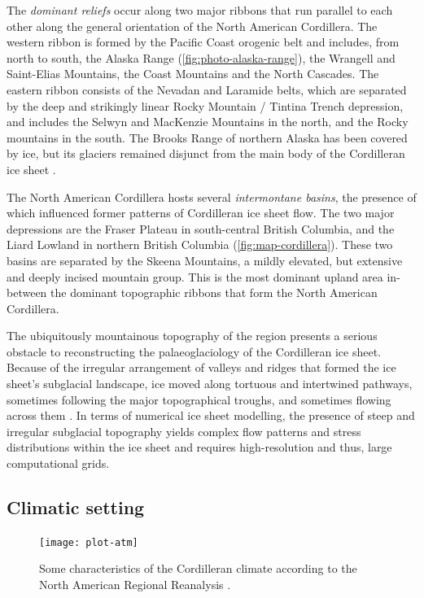 \documentclass[a4paper]{kappa}
\begin{document}
The \emph{dominant reliefs} occur along two major ribbons that run parallel to
each other along the general orientation of the North American Cordillera. The
western ribbon is formed by the Pacific Coast orogenic belt and includes, from
north to south, the Alaska Range (\cref{fig:photo-alaska-range}), the Wrangell
and Saint-Elias Mountains,
the Coast Mountains and the North Cascades. The eastern ribbon consists of the
Nevadan and Laramide belts, which are separated by the deep and strikingly
linear Rocky Mountain / Tintina Trench depression, and includes the Selwyn and
MacKenzie Mountains in the north, and the Rocky mountains in the south. The
Brooks Range of northern Alaska has been covered by ice, but its glaciers
remained disjunct from the main body of the Cordilleran ice sheet
\citep{Kaufman.Manley.2004}.

The North American Cordillera hosts several \emph{intermontane basins}, the
presence
of which influenced former patterns of Cordilleran ice sheet flow. The two
major depressions are the Fraser Plateau in south-central British Columbia, and
the Liard Lowland in northern British Columbia (\cref{fig:map-cordillera}).
These two basins are separated by the Skeena Mountains, a mildly elevated, but
extensive and deeply incised mountain group. This is the most dominant upland
area in-between the dominant topographic ribbons that form the North American
Cordillera.

The ubiquitously mountainous topography of the region presents a serious
obstacle to reconstructing the palaeoglaciology of the Cordilleran ice sheet.
Because of the irregular arrangement of valleys and ridges that formed the ice
sheet's subglacial landscape, ice moved along tortuous and intertwined
pathways, sometimes following the major topographical troughs, and sometimes
flowing across them \citep{Davis.Mathews.1944, Kleman.etal.2010}. In terms of
numerical ice sheet modelling, the presence of steep and irregular subglacial
topography yields complex flow patterns and stress distributions within the ice
sheet and requires high-resolution and thus, large computational grids.

\subsection{Climatic setting}

\begin{figure}
  \texttt{[image: plot-atm]}
  \caption{Some characteristics of the Cordilleran climate according to the
           North American Regional Reanalysis
           \citep[NARR,][]{Mesinger.etal.2006}.}
  \label{fig:plot-atm}
\end{figure}
\end{document}
